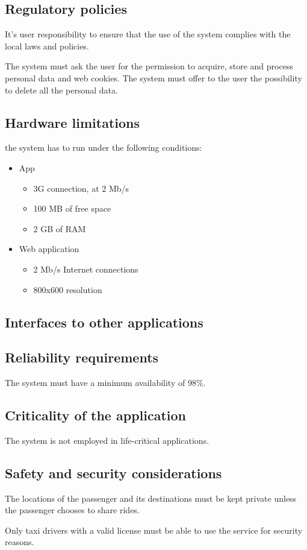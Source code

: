 \subsection{Regulatory policies}
It's user responsibility to ensure that the use of the system complies with the local laws and policies.

The system must ask the user for the permission to acquire, store and process personal data and web cookies. The system must offer to the user the possibility to delete all the personal data.

\subsection{Hardware limitations}
the system has to run under the following conditions:
\begin{itemize}
\item App
\begin{itemize}
\item 3G connection, at 2 Mb/s
\item 100 MB of free space
\item 2 GB of RAM
\end{itemize}
\item Web application
\begin{itemize}
\item 2 Mb/s Internet connections
\item 800x600 resolution
\end{itemize}
\end{itemize}

\subsection{Interfaces to other applications}

\subsection{Reliability requirements}
The system must have a minimum availability of 98\%.

\subsection{Criticality of the application}
The system is not employed in life-critical applications.

\subsection{Safety and security considerations}
The locations of the passenger and its destinations must be kept private unless the passenger chooses to share rides.

Only taxi drivers with a valid license must be able to use the service for security reasons.
